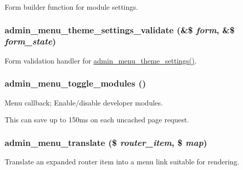 \label{admin__menu_8inc_a4e3734f65911708ed221edc2a7007a23}
Form builder function for module settings. \hypertarget{admin__menu_8inc_a773e8076793591c82ba893436f46153c}{
\subsubsection[{admin\_\-menu\_\-theme\_\-settings\_\-validate}]{\setlength{\rightskip}{0pt plus 5cm}admin\_\-menu\_\-theme\_\-settings\_\-validate (\&\$ {\em form}, \/  \&\$ {\em form\_\-state})}}
\label{admin__menu_8inc_a773e8076793591c82ba893436f46153c}
Form validation handler for \hyperlink{admin__menu_8inc_a4e3734f65911708ed221edc2a7007a23}{admin\_\-menu\_\-theme\_\-settings()}. \hypertarget{admin__menu_8inc_ab2b3513df09bbd7a3deae15086d4898e}{
\subsubsection[{admin\_\-menu\_\-toggle\_\-modules}]{\setlength{\rightskip}{0pt plus 5cm}admin\_\-menu\_\-toggle\_\-modules ()}}
\label{admin__menu_8inc_ab2b3513df09bbd7a3deae15086d4898e}
Menu callback; Enable/disable developer modules.

This can save up to 150ms on each uncached page request. \hypertarget{admin__menu_8inc_a6f21769e09533eece734c5f86e777283}{
\subsubsection[{admin\_\-menu\_\-translate}]{\setlength{\rightskip}{0pt plus 5cm}admin\_\-menu\_\-translate (\$ {\em router\_\-item}, \/  \$ {\em map})}}
\label{admin__menu_8inc_a6f21769e09533eece734c5f86e777283}
Translate an expanded router item into a menu link suitable for rendering.


